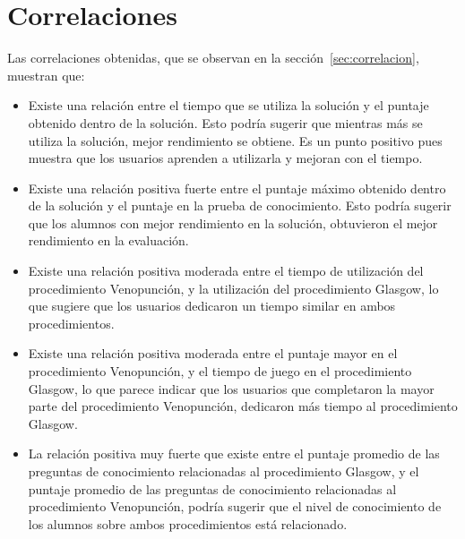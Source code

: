 \section{Correlaciones}

Las correlaciones obtenidas, que se observan en la sección~\ref{sec:correlacion}, muestran
que:

\begin{itemize}

\item Existe una relación entre el tiempo que se utiliza la solución y el
    puntaje obtenido dentro de la solución. Esto podría sugerir que mientras
    más se utiliza la solución, mejor rendimiento se obtiene. Es un punto
    positivo pues muestra que los usuarios aprenden a utilizarla y mejoran con
    el tiempo.

\item Existe una relación positiva fuerte entre el puntaje máximo obtenido
    dentro de la solución y el puntaje en la prueba de conocimiento. Esto podría
    sugerir que los alumnos con mejor rendimiento en la solución, obtuvieron el
    mejor rendimiento en la evaluación.

\item Existe una relación positiva moderada entre el tiempo de utilización del
    procedimiento Venopunción, y la utilización del procedimiento Glasgow, lo
    que sugiere que los usuarios dedicaron un tiempo similar en ambos
    procedimientos.

\item Existe una relación positiva moderada entre el puntaje mayor en el
    procedimiento Venopunción, y el tiempo de juego en el procedimiento Glasgow,
    lo que parece indicar que los usuarios que completaron la mayor parte del
    procedimiento Venopunción, dedicaron más tiempo al procedimiento Glasgow. 

\item La relación positiva muy fuerte que existe entre el puntaje promedio de
    las preguntas de conocimiento relacionadas al procedimiento Glasgow, y el
    puntaje promedio de las preguntas de conocimiento relacionadas al
    procedimiento Venopunción, podría sugerir que el nivel de conocimiento de
    los alumnos sobre ambos procedimientos está relacionado.

\end{itemize}
